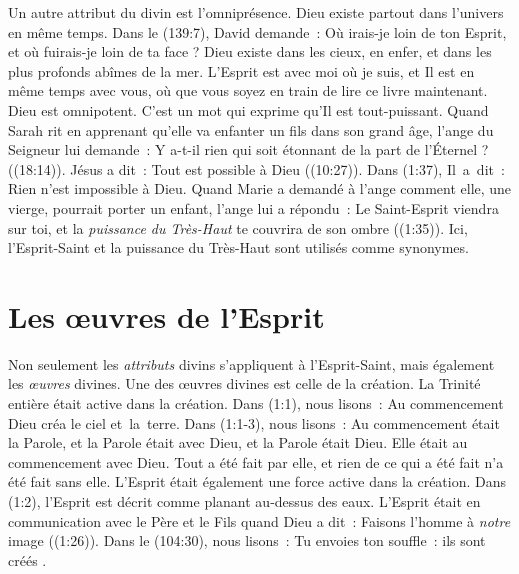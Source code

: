 Un autre attribut du divin est l'omniprésence. Dieu existe partout dans
 l'univers en même temps. Dans le (139:7), David demande~:
 \og Où irais-je loin de ton Esprit, et où fuirais-je loin de ta face ? \fg{}
 Dieu existe dans les cieux, en enfer, et dans les plus profonds abîmes de
 la mer. L'Esprit est avec moi où je suis, et Il est en même temps avec vous,
 où que vous soyez en train de lire ce livre maintenant. Dieu est omnipotent.
 C'est un mot qui exprime qu'Il est tout-puissant. Quand Sarah rit en apprenant
 qu'elle va enfanter un fils dans son grand âge, l'ange du Seigneur lui demande~:
 \og Y a-t-il rien qui soit étonnant de la part de l'Éternel ? \fg{}
 ((18:14)). Jésus a dit~: \og Tout est possible à Dieu \fg{}
 ((10:27)). Dans (1:37), Il~a~dit~:
 \og Rien n'est impossible à Dieu. \fg{} Quand Marie a demandé à l'ange comment
 elle, une vierge, pourrait porter un enfant, l'ange lui a répondu~:
 \og Le Saint-Esprit viendra sur toi, et la \emph{puissance du Très-Haut} te couvrira
 de son ombre \fg{} ((1:35)). Ici, l'Esprit-Saint et
 la puissance du Très-Haut sont utilisés comme synonymes.

\section{Les \oe{}uvres de l'Esprit}


Non seulement les \emph{attributs} divins s'appliquent à l'Esprit-Saint, mais
 également les \emph{œuvres} divines.
 Une des œuvres divines est celle de la création.
 La Trinité entière était active dans la création.
 Dans (1:1), nous lisons~:
 \og Au commencement Dieu créa le ciel et~la~terre. \fg{}
 Dans (1:1-3), nous lisons~:
 \og Au commencement était la Parole, et la Parole était avec Dieu,
 et la Parole était Dieu. Elle était au commencement avec Dieu.
 Tout a été fait par elle, et rien de ce qui a été fait n'a été fait
 sans elle. \fg{}
 L'Esprit était également une force active dans la création.
 Dans (1:2), l'Esprit est décrit comme planant au-dessus
 des eaux. L'Esprit était en communication avec le Père et le Fils quand
 Dieu a dit~: \og Faisons l'homme à \emph{notre} image \fg{} ((1:26)).
 Dans le (104:30), nous lisons~:
 \og Tu envoies ton souffle~: ils sont créés \fg{}
 .

